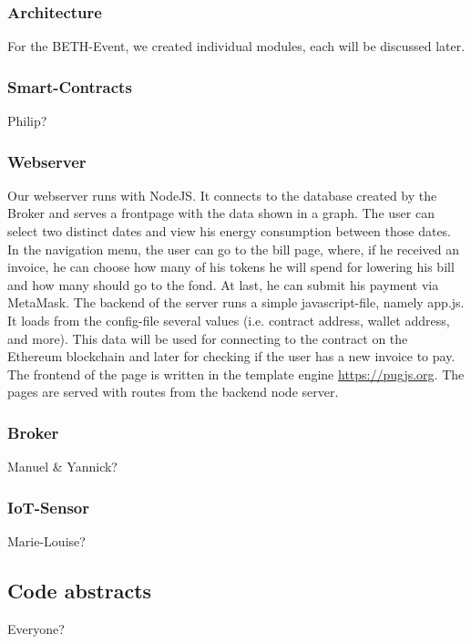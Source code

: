 \subsubsection{Architecture}
For the BETH-Event, we created individual modules, each will be discussed later.

\subsubsection{Smart-Contracts}
Philip?

\subsubsection{Webserver}
Our webserver runs  with NodeJS. It connects to the database created by the Broker and serves a frontpage with the data shown in a graph. The user can select two distinct dates and view his energy consumption between those dates. In the navigation menu, the user can go to the bill page, where, if he received an invoice, he can choose how many of his tokens he will spend for lowering his bill and how many should go to the fond. At last, he can submit his payment via MetaMask. The backend of the server runs a simple javascript-file, namely app.js. It loads from the config-file several values (i.e. contract address, wallet address, and more). This data will be used for connecting to the contract on the Ethereum blockchain and later for checking if the user has a new invoice to pay. The frontend of the page is written in the template engine \hyperref[PugJS]{https://pugjs.org}. The pages are served with routes from the backend node server.

\subsubsection{Broker}
Manuel & Yannick?

\subsubsection{IoT-Sensor}
Marie-Louise?

\subsection{Code abstracts}
Everyone?
